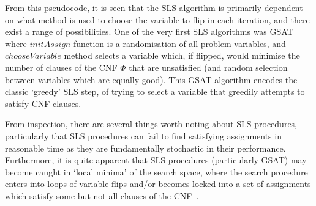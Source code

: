 \documentclass[
10pt, %
a4paper, %
oneside, %
headinclude,footinclude, %
BCOR5mm, %
]{scrartcl}
\begin{document}
From this pseudocode, it is seen that the SLS algorithm is primarily dependent on what method is used to choose the variable to flip in each iteration, and there exist a range of possibilities.
One of the very first SLS algorithms was GSAT \cite{10.5555/1867135.1867203} where $initAssign$ function is a randomisation of all problem variables, and $chooseVariable$ method selects a variable which, if flipped, would minimise the number of clauses of the CNF $\Phi$ that are unsatisfied (and random selection between variables which are equally good).
This GSAT algorithm encodes the classic `greedy' SLS step, of trying to select a variable that greedily attempts to satisfy CNF clauses.

From inspection, there are several things worth noting about SLS procedures, particularly that SLS procedures can fail to find satisfying assignments in reasonable time as they are fundamentally stochastic in their performance.
Furthermore, it is quite apparent that SLS procedures (particularly GSAT) may become caught in `local minima' of the search space, where the search procedure enters into loops of variable flips and/or becomes locked into a set of assignments which satisfy some but not all clauses of the CNF~\cite{journals/jair/GentW93}.
\end{document}
